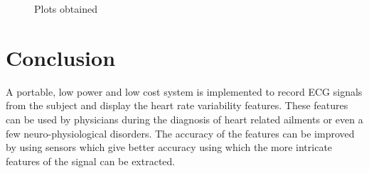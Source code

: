 \documentclass[11pt]{article}
\theoremstyle{definition}
\begin{document}
  \begin{figure}
    \centering
    \qquad
    \qquad
    \qquad
    \qquad
    \caption{Plots obtained}
    \label{fig:globfig2}
  \end{figure}


  \newpage
  \section{Conclusion}
  A portable, low power and low cost system is implemented to record ECG signals from the subject and display the heart rate variability features. These features can be used by physicians during the diagnosis of heart related ailments or even a few neuro-physiological disorders. The accuracy of the features can be improved by using sensors which give better accuracy using which the more intricate features of the signal can be extracted.
\end{document}
